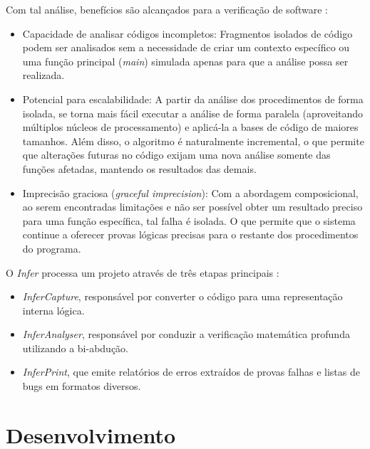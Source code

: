 \documentclass[
    12pt,                %
    openright,           %
    oneside,             %
    a4paper,             %
    english,             %
    brazil               %
]{abntex2}
\begin{document}
\par 
Com tal análise, benefícios são alcançados para a verificação de software \cite{Infer2011}:
\begin{itemize}
\item
Capacidade de analisar códigos incompletos: Fragmentos isolados de código podem ser analisados sem a necessidade de criar um contexto específico ou uma função principal (\textit{main}) simulada apenas para que a análise possa ser realizada.

\item 
Potencial para escalabilidade: A partir da análise dos procedimentos de forma isolada, se torna mais fácil executar a análise de forma paralela (aproveitando múltiplos núcleos de processamento) e aplicá-la a bases de código de maiores tamanhos. Além disso, o algoritmo é naturalmente incremental, o que permite que alterações futuras no código exijam uma nova análise somente das funções afetadas, mantendo os resultados das demais.

\item
Imprecisão graciosa (\textit{graceful imprecision}): Com a abordagem composicional, ao serem encontradas limitações e não ser possível obter um resultado preciso para uma função específica, tal falha é isolada. O que permite que o sistema continue a oferecer provas lógicas precisas para o restante dos procedimentos do programa.
\end{itemize}

\par
O \textit{Infer} processa um projeto através de três etapas principais \cite{Infer2011}:
\begin{itemize}
\item \textit{InferCapture}, responsável por converter o código para uma representação interna lógica.
\item \textit{InferAnalyser}, responsável por conduzir a verificação matemática profunda utilizando a bi-abdução.
\item \textit{InferPrint}, que emite relatórios de erros extraídos de provas falhas e listas de bugs em formatos diversos.
\end{itemize}


\chapter{Desenvolvimento}
\label{cap:desenvolvimento}
\end{document}
